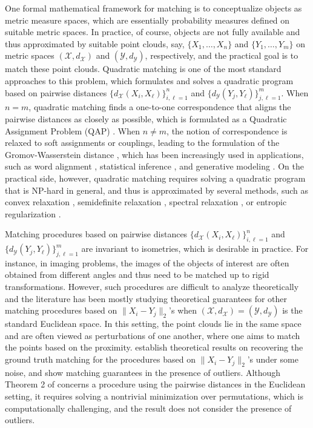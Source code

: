 \documentclass[11pt,letterpaper]{article}
\theoremstyle{definition}
\numberwithin{equation}{section}
\newcommand{\cX}{\mathcal{X}}
\newcommand{\cY}{\mathcal{Y}}
\begin{document}
One formal mathematical framework for matching \citep{memoli2011gromov} is to conceptualize objects as metric measure spaces, which are essentially probability measures defined on suitable metric spaces. In practice, of course, objects are not fully available and thus approximated by suitable point clouds, say, $\{X_1, \ldots, X_n\}$ and $\{Y_1, \ldots, Y_m\}$ on metric spaces $(\cX, d_\cX)$ and $(\cY, d_\cY)$, respectively, and the practical goal is to match these point clouds. Quadratic matching is one of the most standard approaches to this problem, which formulates and solves a quadratic program based on pairwise distances $\{d_\cX(X_i, X_\ell)\}_{i, \ell = 1}^{n}$ and $\{d_\cY(Y_j, Y_\ell)\}_{j, \ell = 1}^{m}$. When $n = m$, quadratic matching finds a one-to-one correspondence that aligns the pairwise distances as closely as possible, which is formulated as a Quadratic Assignment Problem (QAP) \citep{koopmans1957assignment,loiola2007survey}. When $n \neq m$, the notion of correspondence is relaxed to soft assignments or couplings, leading to the formulation of the Gromov-Wasserstein distance \citep{memoli2011gromov}, which has been increasingly used in applications, such as word alignment \citep{alvarez2018gromov}, statistical inference \citep{brecheteau2019statistical,weitkamp2022distribution}, and generative modeling \citep{bunne2019learning,hur2024reversible}. On the practical side, however, quadratic matching requires solving a quadratic program that is NP-hard in general, and thus is approximated by several methods, such as convex relaxation \citep{aflalo2015convex}, semidefinite relaxation \citep{zhao1998semidefinite,kezurer2015tight}, spectral relaxation \citep{leordeanu2005spectral}, or entropic regularization \citep{rangarajan1999convergence,solomon2016entropic,peyre2016gromov}.

Matching procedures based on pairwise distances $\{d_\cX(X_i, X_\ell)\}_{i, \ell = 1}^{n}$ and $\{d_\cY(Y_j, Y_\ell)\}_{j, \ell = 1}^{m}$ are invariant to isometries, which is desirable in practice. For instance, in imaging problems, the images of the objects of interest are often obtained from different angles and thus need to be matched up to rigid transformations. However, such procedures are difficult to analyze theoretically and the literature has been mostly studying theoretical guarantees for other matching procedures based on $\|X_i - Y_j\|_2$'s when $(\cX, d_\cX) = (\cY, d_\cY)$ is the standard Euclidean space. In this setting, the point clouds lie in the same space and are often viewed as perturbations of one another, where one aims to match the points based on the proximity. \cite{collier2016minimax,kunisky2022strong,wang2022random} establish theoretical results on recovering the ground truth matching for the procedures based on $\|X_i - Y_j\|_2$'s under some noise, and \cite{galstyan2022optimal,minasyan2023matching,galstyan2023optimality} show matching guarantees in the presence of outliers. Although Theorem 2 of \cite{wang2022random} concerns a procedure using the pairwise distances in the Euclidean setting, it requires solving a nontrivial minimization over permutations, which is computationally challenging, and the result does not consider the presence of outliers.
\end{document}
